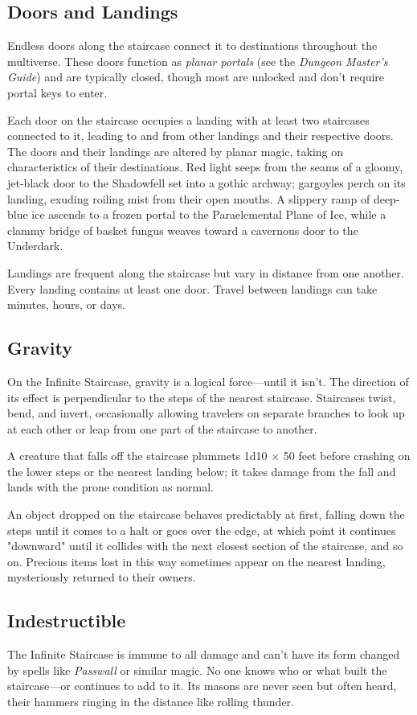 \documentclass[10pt,a4paper,twoside,bg=print,twocolumn,openany,nodeprecatedcode]{dndbook}
\begin{document}
\subsection{Doors and Landings}
Endless doors along the staircase connect it to destinations throughout the multiverse. These doors function as \textit{planar portals} (see the \textit{Dungeon Master's Guide}) and are typically closed, though most are unlocked and don't require portal keys to enter.

Each door on the staircase occupies a landing with at least two staircases connected to it, leading to and from other landings and their respective doors. The doors and their landings are altered by planar magic, taking on characteristics of their destinations. Red light seeps from the seams of a gloomy, jet-black door to the Shadowfell set into a gothic archway; gargoyles perch on its landing, exuding roiling mist from their open mouths. A slippery ramp of deep-blue ice ascends to a frozen portal to the Paraelemental Plane of Ice, while a clammy bridge of basket fungus weaves toward a cavernous door to the Underdark.

Landings are frequent along the staircase but vary in distance from one another. Every landing contains at least one door. Travel between landings can take minutes, hours, or days.

\subsection{Gravity}
On the Infinite Staircase, gravity is a logical force—until it isn't. The direction of its effect is perpendicular to the steps of the nearest staircase. Staircases twist, bend, and invert, occasionally allowing travelers on separate branches to look up at each other or leap from one part of the staircase to another.

A creature that falls off the staircase plummets 1d10 × 50 feet before crashing on the lower steps or the nearest landing below; it takes damage from the fall and lands with the prone condition as normal.

An object dropped on the staircase behaves predictably at first, falling down the steps until it comes to a halt or goes over the edge, at which point it continues "downward" until it collides with the next closest section of the staircase, and so on. Precious items lost in this way sometimes appear on the nearest landing, mysteriously returned to their owners.

\subsection{Indestructible}
The Infinite Staircase is immune to all damage and can't have its form changed by spells like \textit{Passwall} or similar magic. No one knows who or what built the staircase—or continues to add to it. Its masons are never seen but often heard, their hammers ringing in the distance like rolling thunder.
\end{document}
